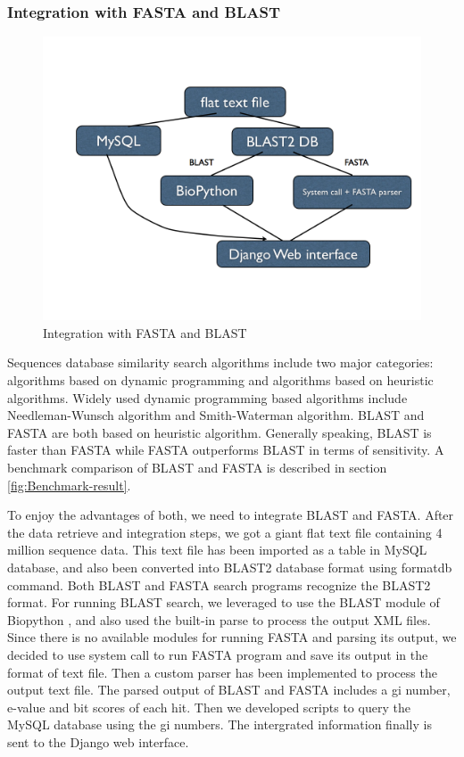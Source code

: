 \documentclass[11pt,letterpaper,twoside,english]{article}
\begin{document}
\subsubsection{\label{sub:Integration-with-FASTA}Integration with FASTA and BLAST}

%
\begin{figure}[H]
\begin{centering}
\includegraphics[width=0.7\linewidth]{figures/Data_flow}
\par\end{centering}

\caption{\label{fig:Integration-with-FASTA}Integration with FASTA and BLAST}

\end{figure}


Sequences database similarity search algorithms include two major
categories: algorithms based on dynamic programming and algorithms
based on heuristic algorithms. Widely used dynamic programming based
algorithms include Needleman-Wunsch algorithm and Smith-Waterman algorithm.
BLAST and FASTA are both based on heuristic algorithm. Generally speaking,
BLAST is faster than FASTA while FASTA outperforms BLAST in terms
of sensitivity. A benchmark comparison of BLAST and FASTA is described
in section \ref{fig:Benchmark-result}.

To enjoy the advantages of both, we need to integrate BLAST and FASTA.
After the data retrieve and integration steps, we got a giant flat
text file containing 4 million sequence data. This text file has been
imported as a table in MySQL database, and also been converted into
BLAST2 database format using formatdb command. Both BLAST and FASTA
search programs recognize the BLAST2 format. For running BLAST search,
we leveraged to use the BLAST module of Biopython \citet{Cock:2009p22197},
and also used the built-in parse to process the output XML files.
Since there is no available modules for running FASTA and parsing
its output, we decided to use system call to run FASTA program and
save its output in the format of text file. Then a custom parser has
been implemented to process the output text file. The parsed output
of BLAST and FASTA includes a gi number, e-value and bit scores of
each hit. Then we developed scripts to query the MySQL database using
the gi numbers. The intergrated information finally is sent to the
Django web interface.
\end{document}
